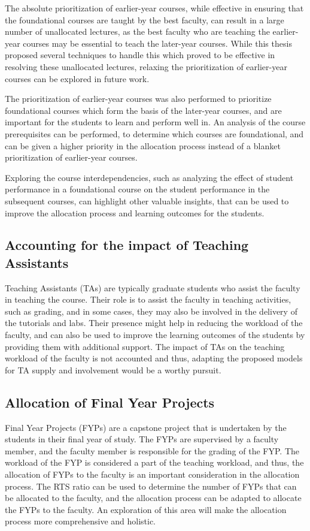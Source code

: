 The absolute prioritization of earlier-year courses, while effective in ensuring that the foundational courses are taught by the best faculty, can result in a large number of unallocated lectures, as the best faculty who are teaching the earlier-year courses may be essential to teach the later-year courses. While this thesis proposed several techniques to handle this which proved to be effective in resolving these unallocated lectures, relaxing the prioritization of earlier-year courses can be explored in future work.

The prioritization of earlier-year courses was also performed to prioritize foundational courses which form the basis of the later-year courses, and are important for the students to learn and perform well in. An analysis of the course prerequisites can be performed, to determine which courses are foundational, and can be given a higher priority in the allocation process instead of a blanket prioritization of earlier-year courses.

Exploring the course interdependencies, such as analyzing the effect of student performance in a foundational course on the student performance in the subsequent courses, can highlight other valuable insights, that can be used to improve the allocation process and learning outcomes for the students.

\subsection{Accounting for the impact of Teaching Assistants}

Teaching Assistants (TAs) are typically graduate students who assist the faculty in teaching the course. Their role is to assist the faculty in teaching activities, such as grading, and in some cases, they may also be involved in the delivery of the tutorials and labs. Their presence might help in reducing the workload of the faculty, and can also be used to improve the learning outcomes of the students by providing them with additional support. The impact of TAs on the teaching workload of the faculty is not accounted and thus, adapting the proposed models for TA supply and involvement would be a worthy pursuit.

\subsection{Allocation of Final Year Projects}

Final Year Projects (FYPs) are a capstone project that is undertaken by the students in their final year of study. The FYPs are supervised by a faculty member, and the faculty member is responsible for the grading of the FYP. The workload of the FYP is considered a part of the teaching workload, and thus, the allocation of FYPs to the faculty is an important consideration in the allocation process. The RTS ratio can be used to determine the number of FYPs that can be allocated to the faculty, and the allocation process can be adapted to allocate the FYPs to the faculty. An exploration of this area will make the allocation process more comprehensive and holistic.

